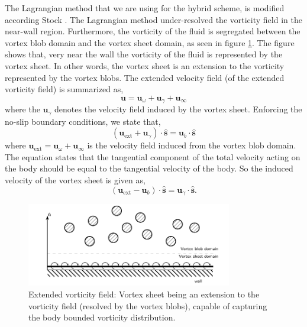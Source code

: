 The Lagrangian method that we are using for the hybrid scheme, is modified according Stock \cite{Stock2010a}. The Lagrangian method under-resolved the vorticity field in the near-wall region. Furthermore, the vorticity of the fluid is segregated between the vortex blob domain and the vortex sheet domain, as seen in figure \ref{fig:extendedVorticityField}. The figure shows that, very near the wall the vorticity of the fluid is represented by the vortex sheet. In other words, the vortex sheet is an extension to the vorticity represented by the vortex blobs. The extended velocity field (of the extended vorticity field) is summarized as,
	\begin{equation}
	\mathbf{u} = \mathbf{u}_{\omega} + \mathbf{u}_{\gamma} + \mathbf{u}_{\infty}
	\end{equation}
where the $\mathbf{u}_{\gamma}$ denotes the velocity field induced by the vortex sheet. Enforcing the no-slip boundary conditions, we state that,
	\begin{equation}
	\left(\mathbf{u}_{\mathrm{ext}} + \mathbf{u}_{\gamma}\right)\cdot\mathbf{\hat{s}} = \mathbf{u}_b \cdot \mathbf{\hat{s}}
	\label{eq:kinematicBCofVSOutside}
	\end{equation}
where $\mathbf{u}_{\mathrm{ext}} = \mathbf{u}_{\omega} + \mathbf{u}_{\infty}$ is the velocity field induced from the vortex blob domain. The equation states that the tangential component of the total velocity acting on the body should be equal to the tangential velocity of the body. So the induced velocity of the vortex sheet is given as,
	\begin{equation}
	\left(\mathbf{u}_{\mathrm{ext}} - \mathbf{u}_b\right) \cdot \mathbf{\hat{s}} = \mathbf{u}_{\gamma}\cdot\mathbf{\hat{s}}.
	\label{eq:kinematicBCofVS}
	\end{equation}

	\begin{figure}[t]
	\centering
	\includegraphics[width=0.8\textwidth]{figures/lagrangian/extendedVorticityField.pdf}
	\caption{Extended vorticity field: Vortex sheet being an extension to the vorticity field (resolved by the vortex blobs), capable of capturing the body bounded vorticity distribution.}
	\label{fig:extendedVorticityField}
	\end{figure}	


